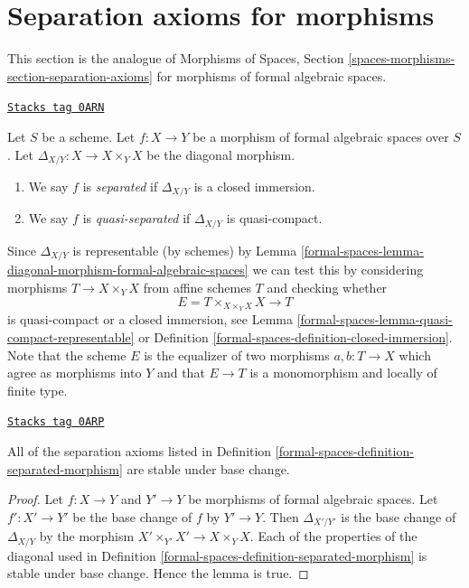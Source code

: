 \section{Separation axioms for morphisms}
\label{formal-spaces-section-separation-axioms}
This section is the analogue of
Morphisms of Spaces, Section \ref{spaces-morphisms-section-separation-axioms}
for morphisms of formal algebraic spaces.

\begin{definition}
\label{formal-spaces-definition-separated-morphism}
\href{https://stacks.math.columbia.edu/tag/0ARN}{\texttt{Stacks tag 0ARN}}

Let $S$ be a scheme.
Let $f : X \to Y$ be a morphism of formal algebraic spaces over $S$.
Let $\Delta_{X/Y} : X \to X \times_Y X$ be the diagonal morphism.
\begin{enumerate}
\item We say $f$ is {\it separated} if $\Delta_{X/Y}$ is a closed immersion.
\item We say $f$ is {\it quasi-separated} if $\Delta_{X/Y}$ is quasi-compact.
\end{enumerate}
\end{definition}

Since $\Delta_{X/Y}$ is representable (by schemes) by
Lemma \ref{formal-spaces-lemma-diagonal-morphism-formal-algebraic-spaces}
we can test this by considering morphisms $T \to X \times_Y X$
from affine schemes $T$ and checking whether
$$
E = T \times_{X \times_Y X} X \longrightarrow T
$$
is quasi-compact or a closed immersion, see
Lemma \ref{formal-spaces-lemma-quasi-compact-representable} or
Definition \ref{formal-spaces-definition-closed-immersion}.
Note that the scheme $E$ is the equalizer of two morphisms
$a, b : T \to X$ which agree as morphisms into $Y$
and that $E \to T$ is a monomorphism and locally of finite type.

\begin{lemma}
\label{formal-spaces-lemma-base-change-separated}
\href{https://stacks.math.columbia.edu/tag/0ARP}{\texttt{Stacks tag 0ARP}}

All of the separation axioms listed in
Definition \ref{formal-spaces-definition-separated-morphism}
are stable under base change.
\end{lemma}

\begin{proof}
Let $f : X \to Y$ and $Y' \to Y$ be morphisms of formal algebraic spaces.
Let $f' : X' \to Y'$ be the base change of $f$ by $Y' \to Y$. Then
$\Delta_{X'/Y'}$ is the base change of $\Delta_{X/Y}$ by
the morphism $X' \times_{Y'} X' \to X \times_Y X$. Each of the properties
of the diagonal used in Definition \ref{formal-spaces-definition-separated-morphism}
is stable under base change. Hence the lemma is true.
\end{proof}

